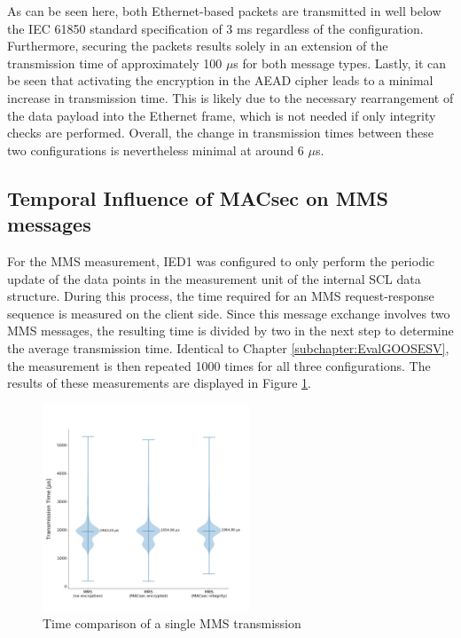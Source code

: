 \documentclass[conference, onecolumn, a4paper]{IEEEtran}
\begin{document}
\noindent As can be seen here, both Ethernet-based packets are transmitted in well below the IEC 61850 standard specification of 3 ms 
\cite{fixedLatencyGOOSESV:2021} regardless of the configuration. Furthermore, securing the packets results solely in an extension of the transmission 
time of approximately 100 $\mu$s for both message types. Lastly, it can be seen that activating the encryption in the AEAD cipher leads to a minimal 
increase in transmission time. This is likely due to the necessary rearrangement of the data payload into the Ethernet frame, which is not needed 
if only integrity checks are performed. Overall, the change in transmission times between these two configurations is nevertheless minimal at around 
6 $\mu$s. 

\subsection{Temporal Influence of MACsec on MMS messages}
\label{subchapter:EvalMMS}
\noindent For the MMS measurement, IED1 was configured to only perform the periodic update of the data points in the measurement unit of the internal 
SCL data structure. During this process, the time required for an MMS request-response sequence is measured on the client side. Since this message 
exchange involves two MMS messages, the resulting time is divided by two in the next step to determine the average transmission time. Identical to 
Chapter \ref{subchapter:EvalGOOSESV}, the measurement is then repeated 1000 times for all three configurations. The results of these measurements are 
displayed in Figure \ref{image:MMSTimings}. 

\begin{figure}[h]
    \centering
    \includegraphics[width=0.55\textwidth]{images/MMS_group_all_configs.png}
    \caption{Time comparison of a single MMS transmission}
    \label{image:MMSTimings}
\end{figure}
\end{document}
